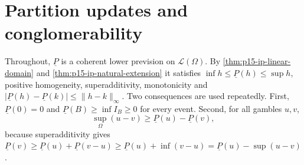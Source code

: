 \section{Partition updates and conglomerability}
\label{sec:annex-p15-w02b-p15-034-partition-updates}

Throughout, \(\underline P\) is a coherent lower prevision on
\(\mathcal L(\Omega)\). By \cref{thm:p15-ip-linear-domain} and
\cref{thm:p15-ip-natural-extension} it satisfies
\(\inf h\leq\underline P(h)\leq\sup h\), positive homogeneity,
superadditivity, monotonicity and
\(|\underline P(h)-\underline P(k)|\leq\|h-k\|_\infty\). Two consequences
are used repeatedly. First, \(\underline P(0)=0\) and
\(\underline P(B)\geq\inf I_B\geq0\) for every event. Second, for all
gambles \(u,v\),
\[
 \sup_{\Omega}(u-v)\geq\underline P(u)-\underline P(v),\tag{\(*\)}
\]
because superadditivity gives
\(\underline P(v)\geq\underline P(u)+\underline P(v-u)
\geq\underline P(u)+\inf(v-u)=\underline P(u)-\sup(u-v)\).

